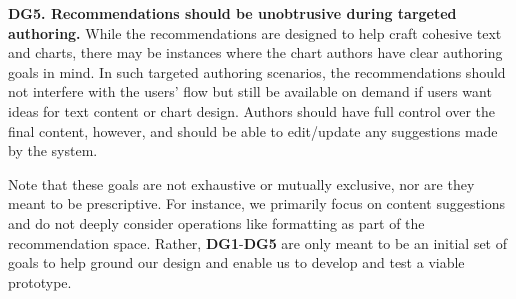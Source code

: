 \vspace{.5em}
\noindent\textbf{DG5. Recommendations should be unobtrusive during targeted authoring.}
While the recommendations are designed to help craft cohesive text and charts, there may be instances where the chart authors have clear authoring goals in mind.
In such targeted authoring scenarios, the recommendations should not interfere with the users' flow but still be available on demand if users want ideas for text content or chart design.
Authors should have full control over the final content, however, and should be able to edit/update any suggestions made by the system.
\newline

\noindent{}Note that these goals are not exhaustive or mutually exclusive, nor are they meant to be prescriptive.
For instance, we primarily focus on content suggestions and do not deeply consider operations like formatting as part of the recommendation space. Rather, \textbf{DG1}-\textbf{DG5} are only meant to be an initial set of goals to help ground our design and enable us to develop and test a viable prototype.